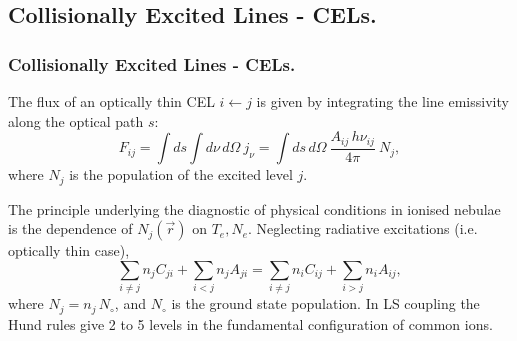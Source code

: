 \subsection{Collisionally Excited Lines - CELs.}
\begin{frame}\frametitle{Collisionally Excited Lines - CELs.}



The flux of an optically thin CEL $i \leftarrow j$ is given by
integrating the line emissivity along the optical path $s$:
\[
F_{ij} = \int ds \int d\nu \, d\Omega ~ j_\nu = \int ds \, d\Omega ~ \frac{
A_{ij}\, h\nu_{ij}}{4\pi}~ N_j ,
\]
where  $N_j$ is the population of the excited level $j$.


The principle underlying the diagnostic of physical conditions in
ionised nebulae is the dependence of $N_j(\vec{r})$ on
$T_e,N_e$. Neglecting radiative excitations (i.e. optically thin case),
\[
\sum_{i{\neq}j}
{n}_{j}{C}_{ji} +
\sum_{i<j}{n}_{j}{A}_{ji} = \sum_{i{\neq}j}{n}_{i}{C}_{ij}  + \sum_{i>j}{n}_{i}{A}_{ij}, 
\]
where $N_j = n_j \, N_\circ$, and $N_\circ$ is the ground state
population. In LS coupling the Hund rules give 2 to 5 levels in the
fundamental configuration of common ions. 

\end{frame}
